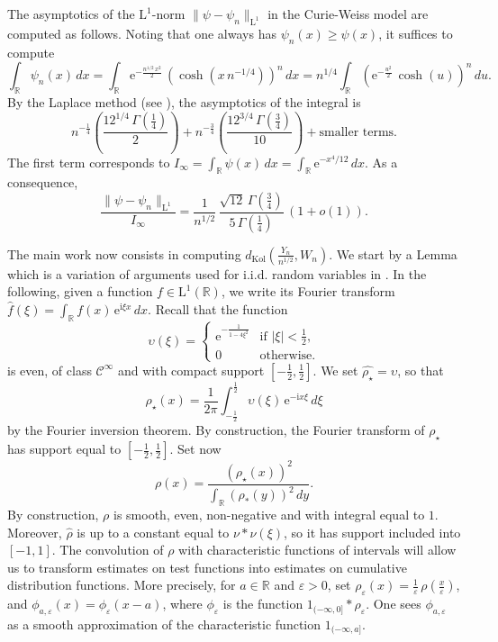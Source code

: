 \documentclass[12pt,a4paper,reqno]{amsart}
\newcommand{\R}{\mathbb{R}}
\newcommand{\E}{\mathrm{e}}
\newcommand{\I}{\mathrm{i}}
\newcommand{\eps}{\varepsilon}
\newcommand{\leb}{\mathrm{L}}
\theoremstyle{remark}
\begin{document}
The asymptotics of the $\leb^1$-norm $\|\psi-\psi_n\|_{\leb^1}$ in the Curie-Weiss model are computed as follows. Noting that one always has $\psi_n(x) \geq \psi(x)$, it suffices to compute
$$\int_{\R} \psi_n(x)\,dx = \int_{\R} \E^{-\frac{n^{1/2}\,x^2}{2}}\,\left(\cosh(x\,n^{-1/4})\right)^{n}\,dx=n^{1/4}  \int_{\R} \left(\E^{-\frac{u^2}{2}}\,\cosh(u)\right)^{n}\,du.$$
By the Laplace method (see \cite[Formula (19.17), p. 624-625]{Zor04}), the asymptotics of the integral is
$$n^{-\frac{1}{4}}\left(\frac{{12}^{1/4}\,\Gamma(\frac{1}{4})}{2}\right)+n^{-\frac{3}{4}}\left(\frac{12^{3/4}\,\Gamma(\frac{3}{4})}{10}\right)+\text{smaller terms}.$$
The first term corresponds to $I_\infty=\int_{\R} \psi(x)\,dx = \int_{\R}\E^{-x^4/12}\,dx$. As a consequence, 
$$\frac{\|\psi-\psi_n\|_{\mathrm{L}^1}}{I_\infty}=\frac{1}{n^{1/2}}\,\frac{\sqrt{12}\,\Gamma(\frac{3}{4})}{5\,\Gamma(\frac{1}{4})}\,(1+o(1)) .$$
\bigskip

The main work now consists in computing $d_{\mathrm{Kol}}(\frac{Y_n}{n^{1/2}},W_n)$. We start by a Lemma which is a variation of arguments used for i.i.d. random variables in \cite[p. 87]{Tao12}. In the following, given a function $f \in \mathrm{L}^1(\R)$, we write its Fourier transform $\widehat{f}(\xi)=\int_{\R}f(x)\,\E^{\I \xi x}\,dx$. Recall that the function
$$\upsilon(\xi)=\begin{cases}\E^{-\frac{1}{1-4\xi^2}} &\text{if }|\xi|<\frac{1}{2},\\
0&\text{otherwise}.
\end{cases}$$
is even, of class $\mathcal{C}^\infty$ and with compact support $[-\frac{1}{2},\frac{1}{2}]$. We set $\widehat{\rho_\star}=\upsilon$, so that $$\rho_\star(x)=\frac{1}{2\pi}\int_{-\frac{1}{2}}^{\frac{1}{2}} \upsilon(\xi)\,\E^{-\I x \xi}\, d\xi$$
by the Fourier inversion theorem. By construction, the Fourier transform of $\rho_\star$ has support equal to $[-\frac{1}{2},\frac{1}{2}]$. Set now 
$$\rho(x)=\frac{(\rho_\star(x))^2}{\int_{\R} (\rho_*(y))^2\,dy}.$$ 
By construction, $\rho$ is smooth, even, non-negative and with integral equal to $1$. Moreover, $\widehat{\rho}$ is up to a constant equal to $\nu*\nu(\xi)$, so it has support included into $[-1,1]$. The convolution of $\rho$ with characteristic functions of intervals will allow us to transform estimates on test functions into estimates on cumulative distribution functions. More precisely, for $a \in \R$ and $\eps >0$, set
$\rho_\eps(x)=\frac{1}{\eps}\,\rho(\frac{x}{\eps})$, and $\phi_{a,\eps}(x)=\phi_\eps(x-a)$, where $\phi_\eps$ is the function $1_{(-\infty,0]}*\rho_\eps$. One sees $\phi_{a,\eps}$ as a smooth approximation of the characteristic function $1_{(-\infty,a]}$.\bigskip
\end{document}
